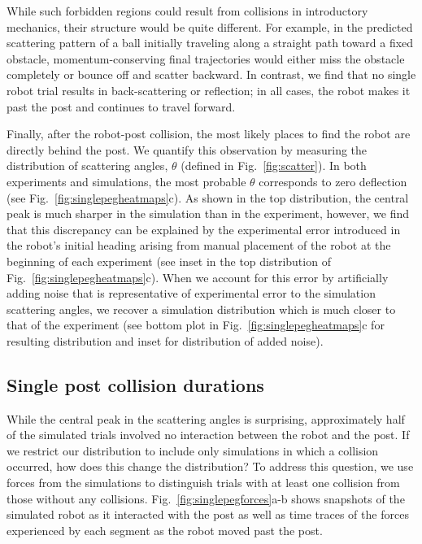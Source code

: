 \documentclass[aps,pre,twocolumn,superscriptaddress]{revtex4-1}
\begin{document}
While such forbidden regions could result from collisions in introductory mechanics, their structure would be quite different. For example, in the predicted scattering pattern of a ball initially traveling along a straight path toward a fixed obstacle, momentum-conserving final trajectories would either miss the obstacle completely or bounce off and scatter backward. In contrast, we find that no single robot trial results in back-scattering or reflection; in all cases, the robot makes it past the post and continues to travel forward.  

Finally, after the robot-post collision, the most likely places to find the robot are directly behind the post. We quantify this observation by measuring the distribution of scattering angles, $\theta$ (defined in Fig.~\ref{fig:scatter}). In both experiments and simulations, the most probable $\theta$ corresponds to zero deflection (see Fig.~\ref{fig:singlepegheatmaps}c). As shown in the top distribution, the central peak is much sharper in the simulation than in the experiment, however, we find that this discrepancy can be explained by the experimental error introduced in the robot's initial heading arising from manual placement of the robot at the beginning of each experiment (see inset in the top distribution of Fig.~\ref{fig:singlepegheatmaps}c).  When we account for this error by artificially adding noise that is representative of experimental error to the simulation scattering angles, we recover a simulation distribution which is much closer to that of the experiment (see bottom plot in Fig.~\ref{fig:singlepegheatmaps}c for resulting distribution and inset for distribution of added noise). 


\subsection{Single post collision durations}\label{sec:singleForces}

While the central peak in the scattering angles is surprising, approximately half of the simulated trials involved no interaction between the robot and the post. If we restrict our distribution to include only simulations in which a collision occurred, how does this change the distribution? To address this question, we use forces from the simulations to distinguish trials with at least one collision from those without any collisions. Fig.~\ref{fig:singlepegforces}a-b shows snapshots of the simulated robot as it interacted with the post as well as time traces of the forces experienced by each segment as the robot moved past the post.
\end{document}
